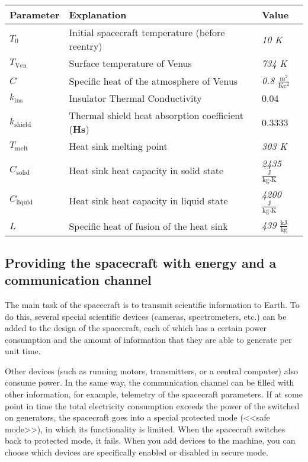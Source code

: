 \documentclass[12pt,a4paper]{article}
\begin{document}
\begin{center}
\begin{tabular}{ |p{2cm}|p{8cm}|p{3cm}| }
  \hline
  \textbf{Parameter} & \textbf{Explanation} & \textbf{Value} \\
   \hline
   $ T_0 $ & Initial spacecraft temperature (before reentry) & \emph{10 K} \\
   \hline
   $ T_{\text{Ven}} $ & Surface temperature of Venus & \emph{734 K} \\
   \hline
   $ C $ & Specific heat of the atmosphere of Venus & \emph{0.8 $\frac{\text{m}^2}{\text{K}
       \text{c}^2}$} \\
   \hline
   $ k_{\text{ins}} $ & Insulator Thermal Conductivity & 0.04\\
   \hline
   $ k_{\text{shield}} $ & Thermal shield heat absorption coefficient (\textbf{Hs}) & 0.3333\\
   \hline
   $ T_{\text{melt}} $ & Heat sink melting point & \emph{303 K}\\
   \hline
   $ C_{\text{solid}}$ & Heat sink heat capacity in solid state & \emph{2435
     $\frac{\text{J}}{\text{kg} \cdot \text{K}}$}\\
   \hline
   $ C_{\text{liquid}}$ & Heat sink heat capacity in liquid state & \emph{4200
     $\frac{\text{J}}{\text{kg} \cdot \text{K}}$}\\
   \hline
   $ L $ & Specific heat of fusion of the heat sink & \emph{439 $\frac{\text{kJ}}{\text{kg}}$} \\
   \hline
\end{tabular}
\end{center}

\subsection{Providing the spacecraft with energy and a communication channel}

The main task of the spacecraft is to transmit scientific information to Earth. To do this, several special scientific devices (cameras, spectrometers, etc.) can be added to the design of the spacecraft, each of which has a certain power consumption and the amount of information that they are able to generate per unit time.

Other devices (such as running motors, transmitters, or a central computer) also consume power. In the same way, the communication channel can be filled with other information, for example, telemetry of the spacecraft parameters. If at some point in time the total electricity consumption exceeds the power of the switched on generators, the spacecraft goes into a special protected mode (<<safe mode>>), in which its functionality is limited. When the spacecraft switches back to protected mode, it fails. When you add devices to the machine, you can choose which devices are specifically enabled or disabled in secure mode.
\end{document}
